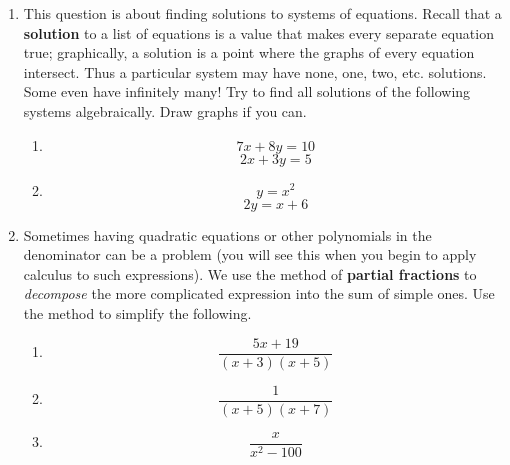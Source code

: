 \documentclass{article}
\begin{document}
\begin{enumerate}
	\item This question is about finding solutions to systems of equations.  Recall that a \textbf{solution} to a list of equations is a value that makes every separate equation true; graphically, a solution is a point where the graphs of every equation intersect.  Thus a particular system may have none, one, two, etc. solutions.  Some even have infinitely many!  Try to find all solutions of the following systems algebraically.  Draw graphs if you can.
		\begin{enumerate}
			\item 
			$$ 7x + 8y = 10 $$
			$$ 2x + 3y = 5 $$
			\item
			$$ y = x^2 $$
			$$ 2y = x + 6$$
		\end{enumerate}




\item Sometimes having quadratic equations or other polynomials in the denominator can be a problem (you will see this when you begin to apply calculus to such expressions).  We use the method of \textbf{partial fractions} to \textit{decompose} the more complicated expression into the sum of simple ones.  Use the method to simplify the following.
\begin{enumerate}

\item $$ \frac{5x + 19}{(x+3)(x+5)}$$
\item $$ \frac{1}{(x+5)(x+7)}$$
\item $$ \frac{x}{x^2 - 100}$$


\end{enumerate}

\end{enumerate}
\end{document}
